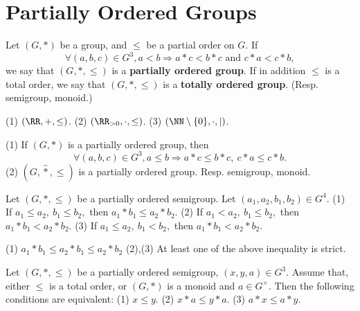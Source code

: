 \section{Partially Ordered Groups}
\begin{definitionenv}
    Let $(G,*)$ be a group, and $\le $ be a partial order on $G$. If 
    $$\forall (a,b,c)\in G^3,a<b\Rightarrow a*c<b*c \text{ and } c*a<c*b,$$
    we say that $(G,*,\le)$ is a \textbf{partially ordered group}. If in addition $\le $ is a total order, we say that $(G,*,\le)$ is a \textbf{totally ordered group}. (Resp. semigroup, monoid.)
\end{definitionenv}
\begin{exampleenv}
    \quad
    (1) $(\RR,+,\le)$.
    \quad
    (2) $(\RR_{>0},\cdot,\le)$.
    \quad
    (3) $(\NN\setminus\{0\},\cdot,\mid)$.
\end{exampleenv}
\begin{remark}
    \quad
    \newline
    (1) If $(G,*)$ is a partially ordered group, then 
    $$\forall (a,b,c)\in G^3,a\le b\Rightarrow a*c\le b*c,\ c*a\le c*b.$$
    (2) $(G,\hat{*},\le )$ is a partially ordered group.
    \newline
    Resp. semigroup, monoid.
\end{remark}
\begin{propositionenv}
    \quad\newline
    Let $(G,*,\le)$ be a partially ordered semigroup.  Let $(a_1,a_2,b_1,b_2)\in G^4$. 
    \newline
    (1) If $a_1\le a_2,\ b_1\le b_2,$ then $a_1*b_1\le a_2*b_2.$
    \newline
    (2) If $a_1< a_2,\ b_1\le b_2,$ then $a_1*b_1< a_2*b_2.$
    \newline
    (3) If $a_1\le a_2,\ b_1<b_2,$ then $a_1*b_1< a_2*b_2.$
\end{propositionenv}
\begin{proofenv}
    \quad \newline
    (1) $a_1*b_1\le a_2*b_1\le a_2*b_2$
    \newline
    (2),(3) At least one of the above inequality is strict.
\end{proofenv}
\begin{propositionenv}
    Let $(G,*,\le)$ be a partially ordered semigroup, $(x,y,a)\in G^3$. Assume that, either $\le $ is a total order, or $(G,*)$ is a monoid and $a\in G^\times$. Then the following conditions are equivalent:
    \newline
    (1) $x\le y$.
    \newline
    (2) $x*a\le y*a$.
    \newline
    (3) $a*x\le a*y$.
\end{propositionenv}
